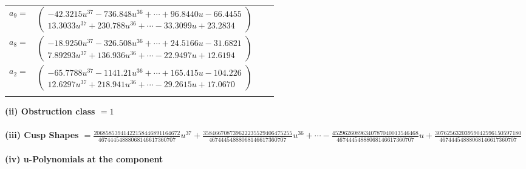 \documentclass[1p]{elsarticle_modified}
\theoremstyle{definition}
\begin{document}
\begin{tabular}{m{7pt} m{180pt} m{7pt} m{180pt} }
\flushright $a_{9}=$&$\begin{pmatrix}-42.3215 u^{37}-736.848 u^{36}+\cdots+96.8440 u-66.4455\\13.3033 u^{37}+230.788 u^{36}+\cdots-33.3099 u+23.2834\end{pmatrix}$ \\
\flushright $a_{8}=$&$\begin{pmatrix}-18.9250 u^{37}-326.508 u^{36}+\cdots+24.5166 u-31.6821\\7.89293 u^{37}+136.936 u^{36}+\cdots-22.9497 u+12.6194\end{pmatrix}$ \\
\flushright $a_{2}=$&$\begin{pmatrix}-65.7788 u^{37}-1141.21 u^{36}+\cdots+165.415 u-104.226\\12.6297 u^{37}+218.941 u^{36}+\cdots-29.2615 u+17.0670\end{pmatrix}$\\&\end{tabular}
\flushleft \textbf{(ii) Obstruction class $= 1$}\\~\\
\flushleft \textbf{(iii) Cusp Shapes $= \frac{20685853941422158446891164672}{46744454888068146617360707} u^{37}+\frac{358466708739622235529406475255}{46744454888068146617360707} u^{36}+\cdots-\frac{45296260896340787040013546468}{46744454888068146617360707} u+\frac{30762563203959042596150597180}{46744454888068146617360707}$}\\~\\
\newpage\renewcommand{\arraystretch}{1}
\flushleft \textbf{(iv) u-Polynomials at the component}\newline \\
\end{document}
